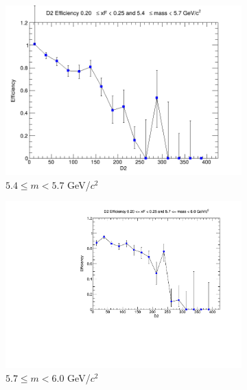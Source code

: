 \documentclass[11pt]{article}
\begin{document}
\begin{figure}[p]
\begin{subfigure}[b]{0.32\textwidth}
        \includegraphics[width=\textwidth]{./kTrackerEfficiencyPlots/D2_Efficiency_xF4_mass4.png}
        \caption{$5.4 \leq m < 5.7$ GeV/$c^2$}
    \end{subfigure}\hfill
    \begin{subfigure}[b]{0.32\textwidth}
        \centering
        \includegraphics[width=\textwidth]{./kTrackerEfficiencyPlots/D2_Efficiency_xF4_mass5.pdf}
        \caption{$5.7 \leq m < 6.0$ GeV/$c^2$}
    \end{subfigure}\vspace{0.5cm}
    \begin{subfigure}[b]{0.32\textwidth}
        \centering

\end{subfigure}
\end{figure}
\end{document}
